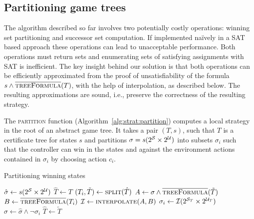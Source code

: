 \subsection{Partitioning game trees}

The algorithm described so far involves two potentially costly operations: winning set partitioning and successor set computation.  If implemented na\"ively in a SAT based approach these operations can lead to unacceptable performance. Both operations must return sets and enumerating sets of satisfying assignments with SAT is inefficient. The key insight behind our solution is that both operations can be efficiently approximated from the proof of unsatisfiability of the formula $s \land \textsc{$\overline{\mbox{treeFormula}}$}(T)$, with the help of interpolation, as described below.  The resulting approximations are sound, i.e., preserve the correctness of the resulting strategy.

The \textsc{partition} function (Algorithm~\ref{alg:strat:partition}) computes a local strategy in the root of an abstract game tree.  It takes a pair $(T, s)$, such that $T$ is a certificate tree for states $s$ and partitions $\sigma = s(2^{\mathcal{S}} \times 2^{\mathcal{U}})$ into subsets $\sigma_i$ such that the controller can win in the states and against the environment actions contained in $\sigma_i$ by choosing action $c_i$.

\begin{algorithm}[t]
   \caption{Partitioning winning states}\label{alg:strat:partition}
   \begin{algorithmic}[1]
        \State $\hat{\sigma} \gets s(2^{\mathcal{S}} \times 2^{\mathcal{U}})$
        \State $\hat{T} \gets T$
        \State $(T_i, \tilde{T}) \gets \Call{split}{\hat{T}}$\label{alg:partition:split}
            \State $A \gets \sigma \land \Call{\opptf}{\tilde{T}} $ \label{alg:strat:partition:Bi}
            \State $B \gets \Call{\opptf}{T_i} $ \label{alg:strat:partition:Ai}
            \State $\mathcal{I} \gets \Call{interpolate}{A, B}$\label{alg:partition:I}
            \State $\sigma_i \gets \mathcal{I}(2^{\mathcal{S}_T} \times 2^{\mathcal{U}_T})$\label{alg:partition:Ii}
            \State $\hat{\sigma} \gets \hat{\sigma} \land \neg \sigma_i$
            \State $\hat{T} \gets \tilde{T}$\label{alg:partition:upd}
        \EndFor
        \State {} \label{alg:strat:partition:return}
        \EndFunction
    \end{algorithmic}
\end{algorithm}

